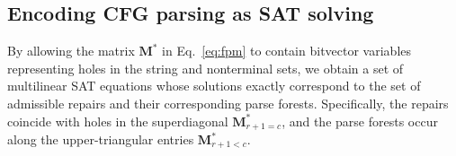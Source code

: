 \documentclass[sigplan,nonacm]{acmart}\settopmatter{printfolios=false,printccs=false,printacmref=false}
\begin{document}
  \subsection{Encoding CFG parsing as SAT solving}\label{sec:sat}

  By allowing the matrix $\mathbf{M}^*$ in Eq.~\ref{eq:fpm} to contain bitvector variables representing holes in the string and nonterminal sets, we obtain a set of multilinear SAT equations whose solutions exactly correspond to the set of admissible repairs and their corresponding parse forests. Specifically, the repairs coincide with holes in the superdiagonal $\mathbf{M}^*_{r+1 = c}$, and the parse forests occur along the upper-triangular entries $\mathbf{M}^*_{r + 1 < c}$.


%

  \newcommand\ddd{\Ddots}
  \newcommand\vdd{\Vdots}
  \newcommand\cdd{\Cdots}
  \newcommand\lds{\ldots}
  \newcommand\vno{\varnothing}
  \newcommand{\ts}[1]{\textsuperscript{#1}}
  \newcommand\non{1\ts{st}}
  \newcommand\ntw{2\ts{nd}}
  \newcommand\nth{3\ts{rd}}
  \newcommand\nfo{4\ts{th}}
  \newcommand\nfi{5\ts{th}}
  \newcommand\nsi{6\ts{th}}
  \newcommand\nse{7\ts{th}}
  \newcommand{\vs}[1]{\{V\}_{\sigma_{#1}}}
  \newcommand\rcr{\rowcolor{black!15}}
  \newcommand\rcw{\rowcolor{white}}
  \newcommand\pcd{\cdot}
  \newcommand\pcp{\phantom\cdot}
  \newcommand\ppp{\phantom{\nse}}
\end{document}
